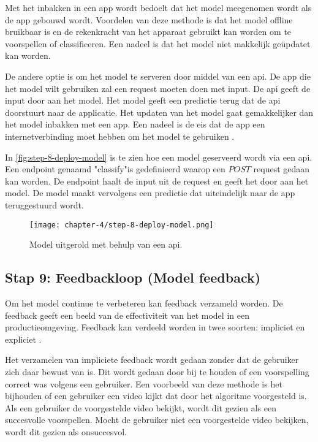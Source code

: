 Met het inbakken in een app wordt bedoelt dat het model meegenomen wordt als de app gebouwd wordt. Voordelen van deze methode is dat het model offline bruikbaar is en de rekenkracht van het apparaat gebruikt kan worden om te voorspellen of classificeren. Een nadeel is dat het model niet makkelijk geüpdatet kan worden.

De andere optie is om het model te serveren door middel van een \Acrshort{api}. De app die het model wilt gebruiken zal een request moeten doen met input. De \Acrshort{api} geeft de input door aan het model. Het model geeft een predictie terug dat de \Acrshort{api} doorstuurt naar de applicatie. Het updaten van het model gaat gemakkelijker dan het model inbakken met een app. Een nadeel is de eis dat de app een internetverbinding moet hebben om het model te gebruiken \cite[p.~130]{introduction-to-machine-learning}.

In \autoref{fig:step-8-deploy-model} is te zien hoe een model geserveerd wordt via een \Acrshort{api}. Een endpoint genaamd "classify"\space is gedefinieerd waarop een \(POST\) request gedaan kan worden. De endpoint haalt de input uit de request en geeft het door aan het model. De model maakt vervolgens een predictie dat uiteindelijk naar de app teruggestuurd wordt.

\begin{figure}[hbt!]
  \centering
  \texttt{[image: chapter-4/step-8-deploy-model.png]}
  \caption{Model uitgerold met behulp van een \Acrshort{api}.}
  \label{fig:step-8-deploy-model}
\end{figure}

\subsection{Stap 9: Feedbackloop (Model feedback)}\label{subsec:ch4-feebdack-loop}
Om het model continue te verbeteren kan feedback verzameld worden. De feedback geeft een beeld van de effectiviteit van het model in een productieomgeving. Feedback kan verdeeld worden in twee soorten: impliciet en expliciet \cite[p.~264]{introduction-to-machine-learning}.

Het verzamelen van impliciete feedback wordt gedaan zonder dat de gebruiker zich daar bewust van is. Dit wordt gedaan door bij te houden of een voorspelling correct was volgens een gebruiker. Een voorbeeld van deze methode is het bijhouden of een gebruiker een video kijkt dat door het algoritme voorgesteld is. Als een gebruiker de voorgestelde video bekijkt, wordt dit gezien als een succesvolle voorspellen. Mocht de gebruiker niet een voorgestelde video bekijken, wordt dit gezien als onsuccesvol.

